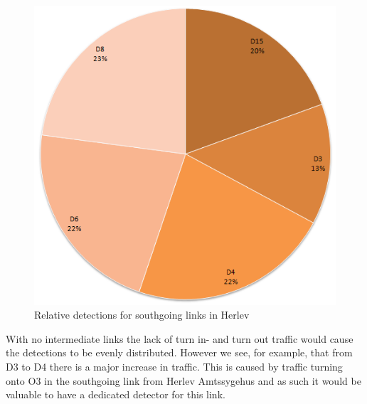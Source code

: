 \begin{figure}[!ht]
\begin{center}
\includegraphics[scale=0.4]{herlev_southgoing_detectors.png} 
\end{center}
\caption{Relative detections for southgoing links in Herlev}
\label{fig:herlev_southgoing}
\end{figure}

With no intermediate links the lack of turn in- and turn out traffic would cause the detections to be evenly distributed. However we see, for example, that from D3 to D4 there is a major increase in traffic. This is caused by traffic turning onto O3 in the southgoing link from Herlev Amtssygehus and as such it would be valuable to have a dedicated detector for this link.

